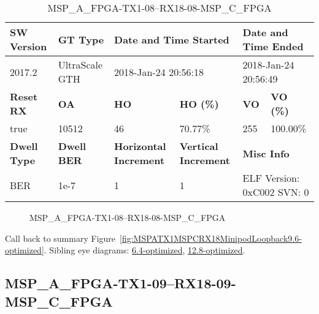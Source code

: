 \begin{table}[h]
\centering
\caption{MSP\_A\_FPGA-TX1-08--RX18-08-MSP\_C\_FPGA}
\label{tab:MSPAFPGATX108RX1808MSPCFPGA9.6-optimized}
\begin{tabular}{@{}|l|l|l|l|l|l|@{}}
\toprule
\textbf{SW Version}                & \textbf{GT Type}   & \multicolumn{2}{l|}{\textbf{Date and Time Started}}            & \multicolumn{2}{l|}{\textbf{Date and Time Ended}}        \\ \midrule
2017.2                       & UltraScale GTH          & \multicolumn{2}{l|}{2018-Jan-24 20:56:18}                   & \multicolumn{2}{l|}{2018-Jan-24 20:56:49}               \\ \midrule
\textbf{Reset RX}                  & \textbf{OA} & \textbf{HO}   & \textbf{HO (\%)} & \textbf{VO} & \textbf{VO (\%)} \\ \midrule
true & 10512        & 46          & 70.77\%        & 255        & 100.00\%       \\ \midrule
\textbf{Dwell Type}                & \textbf{Dwell BER} & \textbf{Horizontal Increment} & \textbf{Vertical Increment}    & \multicolumn{2}{l|}{\textbf{Misc Info}}                  \\ \midrule
BER                            & 1e-7        & 1        & 1           & \multicolumn{2}{l|}{ELF Version: 0xC002 SVN: 0}                         \\ \bottomrule
\end{tabular}
\end{table}

\begin{figure}[h]
\caption{MSP\_A\_FPGA-TX1-08--RX18-08-MSP\_C\_FPGA} \label{fig:MSPAFPGATX108RX1808MSPCFPGA9.6-optimized}
\end{figure}

Call back to summary Figure~\ref{fig:MSPATX1MSPCRX18MinipodLoopback9.6-optimized}.
Sibling eye diagrams: \hyperref[sec:MSPAFPGATX108RX1808MSPCFPGA6.4-optimized]{6.4-optimized}, \hyperref[sec:MSPAFPGATX108RX1808MSPCFPGA12.8-optimized]{12.8-optimized}.

\clearpage
\newpage


\subsection{MSP\_A\_FPGA-TX1-09--RX18-09-MSP\_C\_FPGA}\label{sec:MSPAFPGATX109RX1809MSPCFPGA9.6-optimized}

